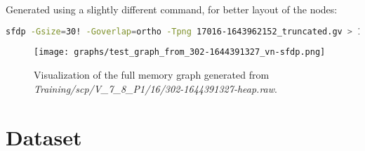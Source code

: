 Generated using a slightly different command, for better layout of the nodes:

\begin{lstlisting}[language=bash, caption={Command used to generate the memory graph visualization of \textit{Training/basic/V\_7\_1\_P1/24/17016-1643962152-heap.raw} here using real addresses.}]
    sfdp -Gsize=30! -Goverlap=ortho -Tpng 17016-1643962152_truncated.gv > 17016-1643962152_truncated.png
\end{lstlisting}

\begin{figure}[H]\label{appendix:mem_graph:302-1644391327:full}
    \centering
    \texttt{[image: graphs/test\_graph\_from\_302-1644391327\_vn-sfdp.png]}
    \caption{Visualization of the full memory graph generated from \textit{Training/scp/V\_7\_8\_P1/16/302-1644391327-heap.raw}.}
\end{figure}

\section{Dataset}